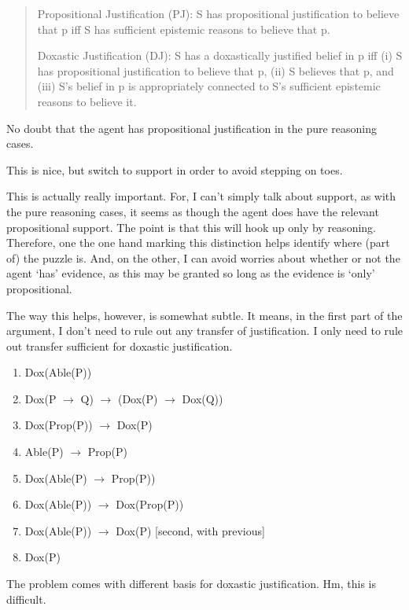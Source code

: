 \documentclass[10pt]{article}
\begin{document}
\begin{note}
\begin{quote}
  Propositional Justification (PJ): S has propositional justification to believe that p iff S has sufficient epistemic reasons to believe that p.

Doxastic Justification (DJ): S has a doxastically justified belief in p iff (i) S has propositional justification to believe that p, (ii) S believes that p, and (iii) S’s belief in p is appropriately connected to S’s sufficient epistemic reasons to believe it.
\end{quote}
No doubt that the agent has propositional justification in the pure reasoning cases.

{
  \color{red}
  This is nice, but switch to support in order to avoid stepping on toes.
}

{
  \color{green}
  This is actually really important.
  For, I can't simply talk about support, as with the pure reasoning cases, it seems as though the agent does have the relevant propositional support.
  The point is that this will hook up only by reasoning.
  Therefore, one the one hand marking this distinction helps identify where (part of) the puzzle is.
  And, on the other, I can avoid worries about whether or not the agent `has' evidence, as this may be granted so long as the evidence is `only' propositional.

  The way this helps, however, is somewhat subtle.
  It means, in the first part of the argument, I don't need to rule out any transfer of justification.
  I only need to rule out transfer sufficient for doxastic justification.
}

\begin{enumerate}
\item Dox(Able(P))
\item Dox(P \(\rightarrow\) Q) \(\rightarrow\) (Dox(P) \(\rightarrow\) Dox(Q))
\item Dox(Prop(P)) \(\rightarrow\) Dox(P)
\item Able(P) \(\rightarrow\) Prop(P)
\item Dox(Able(P) \(\rightarrow \) Prop(P))
\item Dox(Able(P)) \(\rightarrow\) Dox(Prop(P))
\item Dox(Able(P)) \(\rightarrow\) Dox(P) [second, with previous]
\item Dox(P)
\end{enumerate}

The problem comes with different basis for doxastic justification.
Hm, this is difficult.


\end{note}
\end{document}
